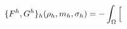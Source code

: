 \documentclass[preview]{standalone}
\begin{document}
\begin{align*}
\special{dvisvgm:raw <g id='unique000'>}\{F^h,G^h\}_h(\rho_h,m_h,\sigma_h)=-\int_\Omega\Big[\special{dvisvgm:raw </g>}
\end{align*}
\end{document}
